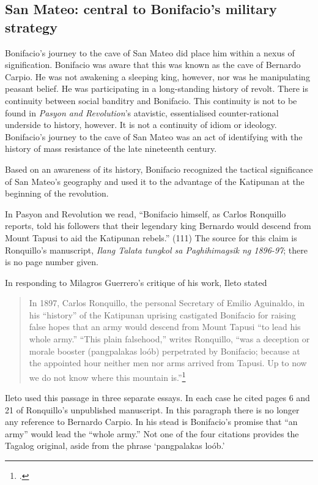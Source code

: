 \subsection{San Mateo: central to Bonifacio's military strategy}

Bonifacio's journey to the cave of San Mateo did place him within a nexus of signification. Bonifacio was aware that this was known as the cave of Bernardo Carpio. He was not awakening a sleeping king, however, nor was he manipulating peasant belief. He was participating in a long-standing history of revolt. There is continuity between social banditry and Bonifacio. This continuity is not to be found in \textit{Pasyon and Revolution}'s atavistic, essentialised counter-rational underside to history, however. It is not a continuity of idiom or ideology. Bonifacio's journey to the cave of San Mateo was an act of identifying with the history of mass resistance of the late nineteenth century.

Based on an awareness of its history, Bonifacio recognized the tactical significance of San Mateo's geography and used it to the advantage of the Katipunan at the beginning of the revolution.

In Pasyon and Revolution we read, \enquote{Bonifacio himself, as Carlos Ronquillo reports, told his followers that their legendary king Bernardo would descend from Mount Tapusi to aid the Katipunan rebels.} (111) The source for this claim is Ronquillo's manuscript, \textit{Ilang Talata tungkol sa Paghihimagsik ng 1896-97}; there is no page number given.

In responding to Milagros Guerrero's critique of his work, Ileto stated

\begin{quote}
In 1897, Carlos Ronquillo, the personal Secretary of Emilio Aguinaldo, in his \enquote{history} of the Katipunan uprising castigated Bonifacio for raising false hopes that an army would descend from Mount Tapusi \enquote{to lead his whole army.} \enquote{This plain falsehood,} writes Ronquillo, \enquote{was a deception or morale booster (pangpalakas lo\'ob) perpetrated by Bonifacio; because at the appointed hour neither men nor arms arrived from Tapusi. Up to now we do not know where this mountain is.}\footcites[217]{Ileto1998a}[12]{Ileto1982a}[27-8]{Ileto1984}
\end{quote}

Ileto used this passage in three separate essays. In each case he cited pages 6 and 21 of Ronquillo's unpublished manuscript. In this paragraph there is no longer any reference to Bernardo Carpio. In his stead is Bonifacio's promise that \enquote{an army} would lead the \enquote{whole army.} Not one of the four citations provides the Tagalog original, aside from the phrase \enquote*{pangpalakas lo\'ob.}

